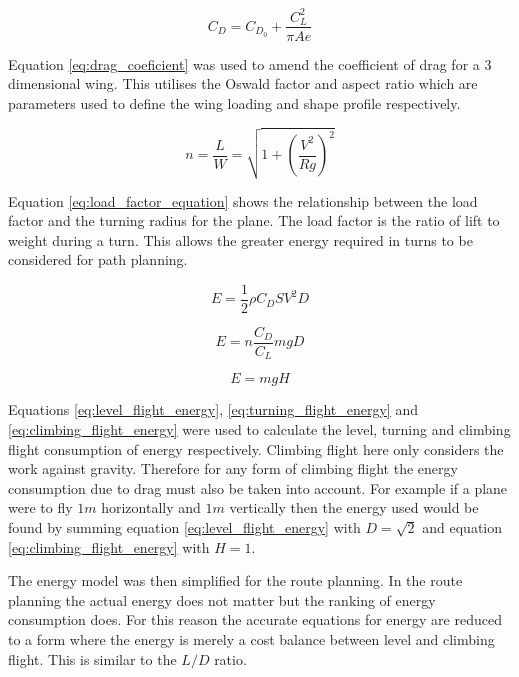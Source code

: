 \documentclass[a4paper,12pt,twoside]{article}
\begin{document}
\begin{equation}
\label{eq:drag_coeficient}
C_D = C_{D_0} + \frac{C_L^2}{\pi A e}
\end{equation}

Equation \ref{eq:drag_coeficient} was used to amend the coefficient of drag for a 3 dimensional wing. This utilises the Oswald factor and aspect ratio which are parameters used to define the wing loading and shape profile respectively.

\begin{equation}
\label{eq:load_factor_equation}
n=\frac{L}{W}=\sqrt{1+\left(\frac{V^2}{R g}\right)^2}
\end{equation}

Equation \ref{eq:load_factor_equation} shows the relationship between the load factor and the turning radius for the plane. The load factor is the ratio of lift to weight during a turn. This allows the greater energy required in turns to be considered for path planning.

\begin{equation}
\label{eq:level_flight_energy}
E = \frac{1}{2} \rho C_D S V^2 D
\end{equation}

\begin{equation}
\label{eq:turning_flight_energy}
E= n\frac{C_D}{C_L} m g D
\end{equation}

\begin{equation}
\label{eq:climbing_flight_energy}
E = mg H
\end{equation}

Equations \ref{eq:level_flight_energy}, \ref{eq:turning_flight_energy} and \ref{eq:climbing_flight_energy} were used to calculate the level, turning and climbing flight consumption of energy respectively. Climbing flight here only considers the work against gravity. Therefore for any form of climbing flight the energy consumption due to drag must also be taken into account. For example if a plane were to fly $1m$ horizontally and $1m$ vertically then the energy used would be found by summing equation \ref{eq:level_flight_energy} with $D=\sqrt{2}$ and equation \ref{eq:climbing_flight_energy} with $H=1$.

The energy model was then simplified for the route planning. In the route planning the actual energy does not matter but the ranking of energy consumption does. For this reason the accurate equations for energy are reduced to a form where the energy is merely a cost balance between level and climbing flight. This is similar to the $L/D$ ratio.
\end{document}
